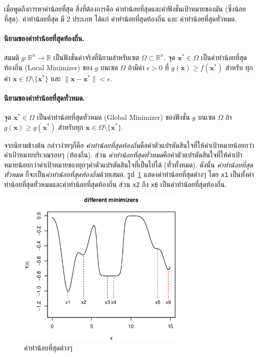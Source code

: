 เมื่อพูดถึงการหาค่าน้อยที่สุด สิ่งที่ต้องการคือ ค่าทำน้อยที่สุดและค่าฟังชั่นเป้าหมายของมัน (ซึ่งน้อยที่สุด).
ค่าทำน้อยที่สุด มี $2$ ประเภท ได้แก่ ค่าทำน้อยที่สุดท้องถิ่น และ ค่าทำน้อยที่สุดทั่วหมด.

\paragraph{นิยามของค่าทำน้อยที่สุดท้องถิ่น.}
สมมติ $g: \mathbb{R}^n \to \mathbb{R}$ เป็นฟังชั่นค่าจริงที่นิยามสำหรับเซต $\Omega \subset \mathbb{R}^n$. 
จุด $\mathbf{x}^* \in \Omega$ เป็นค่าทำน้อยที่สุดท้องถิ่น (Local Minimizer) ของ $g$ บนเซต $\Omega$ ถ้ามีค่า $\epsilon > 0$ ที่ $g(\mathbf{x}) \geq f(\mathbf{x}^*)$ สำหรับ ทุกค่า $\mathbf{x} \in \Omega \setminus \{ \mathbf{x}^*\}$ และ $\| \mathbf{x} - \mathbf{x}^* \| < \epsilon$.

\paragraph{นิยามของค่าทำน้อยที่สุดทั่วหมด.}
จุด $\mathbf{x}^* \in \Omega$  เป็นค่าทำน้อยที่สุดทั่วหมด (Global Minimizer) ของฟังชั่น $g$ บนเซต $\Omega$ ถ้า $g(\mathbf{x}) \geq g(\mathbf{x}^*)$ สำหรับทุก $\mathbf{x} \in \Omega \setminus \{\mathbf{x}^*\}$.

จากนิยามข้างต้น กล่าวง่ายๆก็คือ 
\textit{ค่าทำน้อยที่สุดท้องถิ่น}คือค่าตัวแปรตัดสินใจที่ให้ค่าเป้าหมายน้อยกว่าค่าเป้าหมายบริเวณรอบๆ (ท้องถิ่น).
ส่วน \textit{ค่าทำน้อยที่สุดทั่วหมด}คือค่าตัวแปรตัดสินใจที่ให้ค่าเป้าหมายน้อยกว่าค่าเป้าหมายของทุกๆค่าตัวแปรตัดสินใจที่เป็นไปได้ (ทั่วทั้งหมด).
ดังนั้น \textit{ค่าทำน้อยที่สุดทั่วหมด} ก็จะเป็น\textit{ค่าทำน้อยที่สุดท้องถิ่น}ด้วยเสมอ.
รูป~\ref{fig: minimizers} แสดงค่าทำน้อยที่สุดต่างๆ โดย 
\texttt{x1} เป็นทั้งค่าทำน้อยที่สุดทั่วหมดและค่าทำน้อยที่สุดท้องถิ่น
ส่วน \texttt{x2} ถึง \texttt{x6} เป็นค่าทำน้อยที่สุดท้องถิ่น.

%
\begin{figure}
\begin{center}
\includegraphics[height=3.0in]
{02Background/minimizers.eps}
\end{center}
\caption{ค่าทำน้อยที่สุดต่างๆ}
\label{fig: minimizers}
\end{figure}
%

